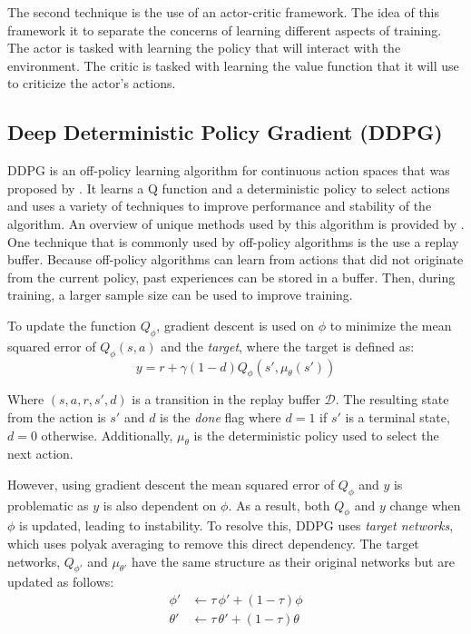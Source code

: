 \documentclass[conference]{IEEEtran}
\begin{document}
The second technique is the use of an actor-critic framework. The idea of this framework it to separate the concerns of learning different aspects of training. The actor is tasked with learning the policy that will interact with the environment. The critic is tasked with learning the value function that it will use to criticize the actor's actions. \cite{deepmind_slides_9}

\subsection{Deep Deterministic Policy Gradient (DDPG)}

DDPG is an off-policy learning algorithm for continuous action spaces that was proposed by \cite{DDPG}. It learns a Q function and a deterministic policy to select actions and uses a variety of techniques to improve performance and stability of the algorithm. An overview of unique methods used by this algorithm is provided by \cite{spinning_up_ddpg}. One technique that is commonly used by off-policy algorithms is the use a replay buffer. Because off-policy algorithms can learn from actions that did not originate from the current policy, past experiences can be stored in a buffer. Then, during training, a larger sample size can be used to improve training.

To update the function $Q_\phi$, gradient descent is used on $\phi$ to minimize the mean squared error of $Q_\phi(s, a)$ and the \textit{target}, where the target is defined as:
$$
    y = r + \gamma(1-d)Q_\phi(s', \mu_\theta(s'))
$$

Where $(s, a, r, s', d)$ is a transition in the replay buffer $\mathcal{D}$. The resulting state from the action is $s'$ and $d$ is the \textit{done} flag where $d=1$ if $s'$ is a terminal state, $d=0$ otherwise. Additionally, $\mu_\theta$ is the deterministic policy used to select the next action.

However, using gradient descent the mean squared error of $Q_\phi$ and $y$ is problematic as $y$ is also dependent on $\phi$. As a result, both $Q_\phi$ and $y$ change when $\phi$ is updated, leading to instability. To resolve this, DDPG uses \textit{target networks}, which uses polyak averaging to remove this direct dependency. The target networks, $Q_{\phi'}$ and $\mu_{\theta'}$ have the same structure as their original networks but are updated as follows:
\begin{align*}
    \phi'   & \leftarrow \tau \, \phi' + (1 - \tau) \phi     \\
    \theta' & \leftarrow \tau \, \theta' + (1 - \tau) \theta
\end{align*}
\end{document}
